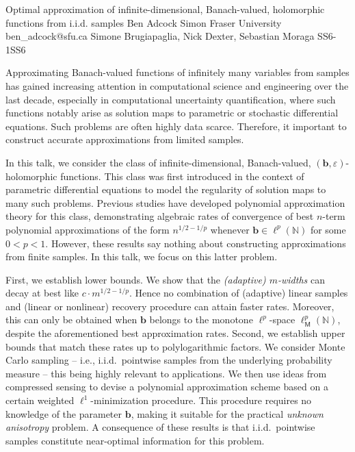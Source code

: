\begin{talk}
  {Optimal approximation of infinite-dimensional, Banach-valued, holomorphic functions from i.i.d. samples}%
  {Ben Adcock}%
  {Simon Fraser University}%
  {ben_adcock@sfu.ca}%
  {Simone Brugiapaglia, Nick Dexter, Sebastian Moraga}%
{}{}{SS6-1}{SS6}

		
		
		
	
Approximating Banach-valued functions of infinitely many variables from samples has gained increasing attention in computational science and engineering over the last decade, especially in computational uncertainty quantification, where such functions notably arise as solution maps to parametric or stochastic differential equations. 
Such problems are often highly data scarce. Therefore, it important to construct accurate approximations from limited samples.

In this talk, we consider the class of infinite-dimensional, Banach-valued, $(\bm{b},\varepsilon)$-holomorphic functions. This class was first introduced in the context of parametric differential equations to model the regularity of solution maps to many such problems. Previous studies have developed polynomial approximation theory for this class, demonstrating algebraic rates of convergence of best $n$-term polynomial approximations of the form $n^{1/2-1/p}$ whenever $\bm{b} \in \ell^p(\mathbb{N})$ for some $0 < p < 1$. However, these results say nothing about constructing approximations from finite samples. In this talk, we focus on this latter problem.

First, we establish lower bounds. We show that the \textit{(adaptive) $m$-widths} can decay at best like $c \cdot m^{1/2-1/p}$. Hence no combination of (adaptive) linear samples and (linear or nonlinear) recovery procedure can attain faster rates. Moreover, this can only be obtained when $\bm{b}$ belongs to the monotone $\ell^p$-space $\ell^p_{\mathsf{M}}(\mathbb{N})$, despite the aforementioned best approximation rates.
Second, we establish upper bounds that match these rates up to polylogarithmic factors. We consider Monte Carlo sampling -- i.e., i.i.d.\ pointwise samples from the underlying probability measure -- this being highly relevant to applications. We then use ideas from compressed sensing to devise a polynomial approximation scheme based on a certain weighted $\ell^1$-minimization procedure. This procedure requires no knowledge of the parameter $\bm{b}$, making it suitable for the practical \textit{unknown anisotropy} problem. A consequence of these results is that i.i.d.\ pointwise samples constitute near-optimal information for this problem.


\end{talk}
